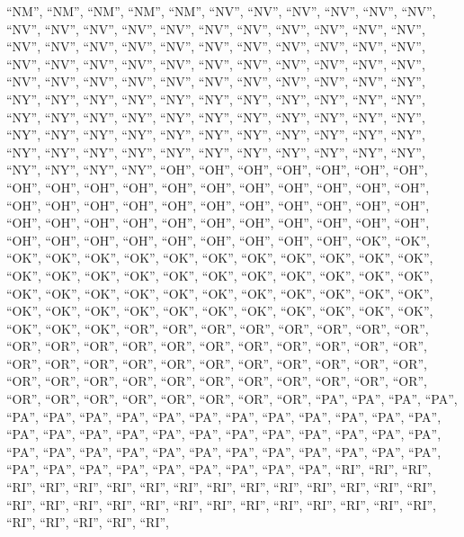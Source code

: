 \documentclass[
]{article}
\begin{document}
``NM'', ``NM'', ``NM'', ``NM'', ``NM'', ``NV'', ``NV'', ``NV'', ``NV'',
``NV'', ``NV'', ``NV'', ``NV'', ``NV'', ``NV'', ``NV'', ``NV'', ``NV'',
``NV'', ``NV'', ``NV'', ``NV'', ``NV'', ``NV'', ``NV'', ``NV'', ``NV'',
``NV'', ``NV'', ``NV'', ``NV'', ``NV'', ``NV'', ``NV'', ``NV'', ``NV'',
``NV'', ``NV'', ``NV'', ``NV'', ``NV'', ``NV'', ``NV'', ``NV'', ``NV'',
``NV'', ``NV'', ``NV'', ``NV'', ``NV'', ``NV'', ``NV'', ``NV'', ``NV'',
``NY'', ``NY'', ``NY'', ``NY'', ``NY'', ``NY'', ``NY'', ``NY'', ``NY'',
``NY'', ``NY'', ``NY'', ``NY'', ``NY'', ``NY'', ``NY'', ``NY'', ``NY'',
``NY'', ``NY'', ``NY'', ``NY'', ``NY'', ``NY'', ``NY'', ``NY'', ``NY'',
``NY'', ``NY'', ``NY'', ``NY'', ``NY'', ``NY'', ``NY'', ``NY'', ``NY'',
``NY'', ``NY'', ``NY'', ``NY'', ``NY'', ``NY'', ``NY'', ``NY'', ``NY'',
``NY'', ``NY'', ``NY'', ``NY'', ``OH'', ``OH'', ``OH'', ``OH'', ``OH'',
``OH'', ``OH'', ``OH'', ``OH'', ``OH'', ``OH'', ``OH'', ``OH'', ``OH'',
``OH'', ``OH'', ``OH'', ``OH'', ``OH'', ``OH'', ``OH'', ``OH'', ``OH'',
``OH'', ``OH'', ``OH'', ``OH'', ``OH'', ``OH'', ``OH'', ``OH'', ``OH'',
``OH'', ``OH'', ``OH'', ``OH'', ``OH'', ``OH'', ``OH'', ``OH'', ``OH'',
``OH'', ``OH'', ``OH'', ``OH'', ``OH'', ``OH'', ``OH'', ``OH'', ``OK'',
``OK'', ``OK'', ``OK'', ``OK'', ``OK'', ``OK'', ``OK'', ``OK'', ``OK'',
``OK'', ``OK'', ``OK'', ``OK'', ``OK'', ``OK'', ``OK'', ``OK'', ``OK'',
``OK'', ``OK'', ``OK'', ``OK'', ``OK'', ``OK'', ``OK'', ``OK'', ``OK'',
``OK'', ``OK'', ``OK'', ``OK'', ``OK'', ``OK'', ``OK'', ``OK'', ``OK'',
``OK'', ``OK'', ``OK'', ``OK'', ``OK'', ``OK'', ``OK'', ``OK'', ``OK'',
``OK'', ``OK'', ``OK'', ``OR'', ``OR'', ``OR'', ``OR'', ``OR'', ``OR'',
``OR'', ``OR'', ``OR'', ``OR'', ``OR'', ``OR'', ``OR'', ``OR'', ``OR'',
``OR'', ``OR'', ``OR'', ``OR'', ``OR'', ``OR'', ``OR'', ``OR'', ``OR'',
``OR'', ``OR'', ``OR'', ``OR'', ``OR'', ``OR'', ``OR'', ``OR'', ``OR'',
``OR'', ``OR'', ``OR'', ``OR'', ``OR'', ``OR'', ``OR'', ``OR'', ``OR'',
``OR'', ``OR'', ``OR'', ``OR'', ``OR'', ``OR'', ``OR'', ``PA'', ``PA'',
``PA'', ``PA'', ``PA'', ``PA'', ``PA'', ``PA'', ``PA'', ``PA'', ``PA'',
``PA'', ``PA'', ``PA'', ``PA'', ``PA'', ``PA'', ``PA'', ``PA'', ``PA'',
``PA'', ``PA'', ``PA'', ``PA'', ``PA'', ``PA'', ``PA'', ``PA'', ``PA'',
``PA'', ``PA'', ``PA'', ``PA'', ``PA'', ``PA'', ``PA'', ``PA'', ``PA'',
``PA'', ``PA'', ``PA'', ``PA'', ``PA'', ``PA'', ``PA'', ``PA'', ``PA'',
``PA'', ``PA'', ``RI'', ``RI'', ``RI'', ``RI'', ``RI'', ``RI'', ``RI'',
``RI'', ``RI'', ``RI'', ``RI'', ``RI'', ``RI'', ``RI'', ``RI'', ``RI'',
``RI'', ``RI'', ``RI'', ``RI'', ``RI'', ``RI'', ``RI'', ``RI'', ``RI'',
``RI'', ``RI'', ``RI'', ``RI'', ``RI'', ``RI'', ``RI'', ``RI'', ``RI'',
\end{document}
